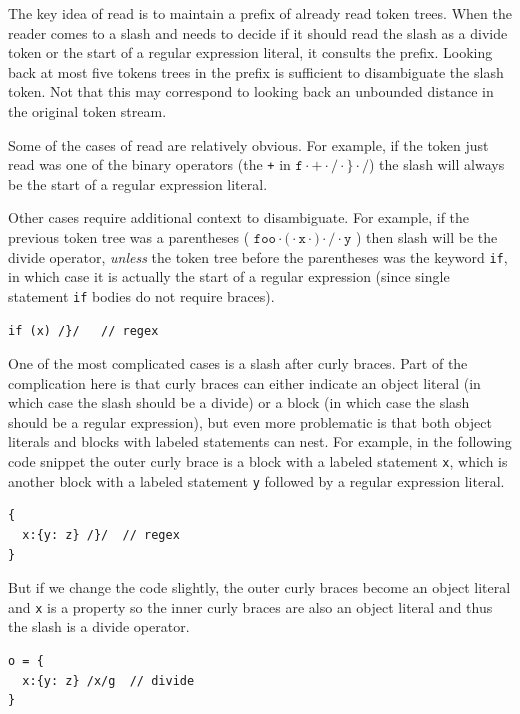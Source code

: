 \documentclass[preprint,10pt]{sigplanconf}
\begin{document}
The key idea of read is to maintain a prefix of already read token
trees. When the reader comes to a slash and needs to decide if it
should read the slash as a divide token or the start of a regular
expression literal, it consults the prefix. Looking back at most five
tokens trees in the prefix is sufficient to disambiguate the slash
token. Not that this may correspond to looking back an unbounded
distance in the original token stream.

Some of the cases of read are relatively obvious. For example, if the
token just read was one of the binary operators (\eg the \texttt{+} in
\(\texttt{f} \cdot \texttt{+} \cdot \texttt{/} 
\cdot \texttt{\}} \cdot \texttt{/}
\)) the slash will always be the start of a regular expression
literal. 

Other cases require additional context to disambiguate. For example,
if the previous token tree was a parentheses (\eg 
\(
\texttt{foo} \cdot \texttt{(} \cdot \texttt{x} \cdot \texttt{)} \cdot \texttt{/} \cdot \texttt{y}
\)
) then slash will be the divide
operator, \emph{unless} the token tree before the parentheses was the
keyword \texttt{if}, in which case it is actually the start of a
regular expression (since single statement \texttt{if} bodies do not require
braces).

\begin{lstlisting}
if (x) /}/   // regex
\end{lstlisting}

One of the most complicated cases is a slash after curly braces. Part
of the complication here is that curly braces can either indicate an
object literal (in which case the slash should be a divide) or a block
(in which case the slash should be a regular expression), but even
more problematic is that both object literals and blocks with labeled
statements can nest. For example, in the following code snippet the
outer curly brace is a block with a labeled statement \verb!x!, which
is another block with a labeled statement \verb!y! followed by a
regular expression literal.
\begin{lstlisting}
{
  x:{y: z} /}/  // regex
}
\end{lstlisting}

But if we change the code slightly, the outer curly braces become an
object literal and \verb!x! is a property so the inner curly
braces are also an object literal and thus the slash is a divide operator.

\begin{lstlisting}
o = {
  x:{y: z} /x/g  // divide
}
\end{lstlisting}
\end{document}
